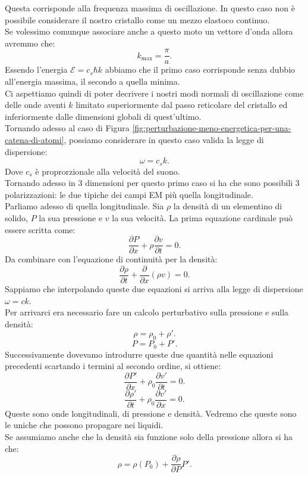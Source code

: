 \noindent
Questa corrisponde alla frequenza massima di oscillazione. In questo caso non è possibile considerare il nostro cristallo come un mezzo elastoco continuo. \\
Se volessimo comunque associare anche a questo moto un vettore d'onda allora avremmo che:
\[
	k_{\text{max}} = \frac{\pi}{a}
.\] 
Essendo l'energia $\mathcal{E} = c_s \hbar k$ abbiamo che il primo caso corrisponde senza dubbio all'energia massima, il secondo a quella minima.\\
Ci aspettiamo quindi di poter decrivere i nostri modi normali di oscillazione come delle onde aventi $k$ limitato superiormente dal passo reticolare del cristallo ed inferiormente dalle dimensioni globali di quest'ultimo.\\
Tornando adesso al caso di Figura \ref{fig:perturbazione-meno-energetica-per-una-catena-di-atomi}, possiamo considerare in questo caso valida la legge di dispersione:
\[
	\omega = c_sk
.\] 
Dove $c_s$ è proprorzionale alla velocità del suono.\\
Tornando adesso in 3 dimensioni per questo primo caso si ha che sono possibili 3 polarizzazioni: le due tipiche dei campi EM più quella longitudinale.\\
Parliamo adesso di quella longitudinale. Sia $\rho$ la densità di un elementino di solido, $P$ la sua pressione e $v$ la sua velocità. La prima equazione cardinale può essere scritta come:
\[
	\frac{\partial P}{\partial x} + \rho \frac{\partial v}{\partial t} = 0
.\] 
Da combinare con l'equazione di continuità per la densità:
\[
	\frac{\partial \rho }{\partial t} +
	\frac{\partial }{\partial x} \left( \rho v \right) 
	= 
	0 
.\]  
Sappiamo che interpolando queste due equazioni si arriva alla legge di dispersione $\omega = c k$. \\
Per arrivarci era necessario fare un calcolo perturbativo sulla pressione e sulla densità:
\[
	\rho = \rho_0+ \rho ' 
.\] 
\[
	P = P_0 + P'
.\] 
Successivamente dovevamo introdurre queste due quantità nelle equazioni precedenti scartando i termini al secondo ordine, si ottiene:
\[
	\frac{\partial P'}{\partial x} +
	\rho_0 \frac{\partial v'}{\partial t} 
	=
	0
.\] 
\[
	\frac{\partial \rho '}{\partial t} + 
	\rho_0 \frac{\partial v' }{\partial x} 
	=
	0  
.\] 
Queste sono onde longitudinali, di pressione e densità. Vedremo che queste sono le uniche che possono propagare nei liquidi. \\
Se assumiamo anche che la densità sia funzione solo della pressione allora si ha che:
\[
	\rho 
	=
	\rho ( P_0) +
	\frac{\partial \rho }{\partial P} P'
.\] 
